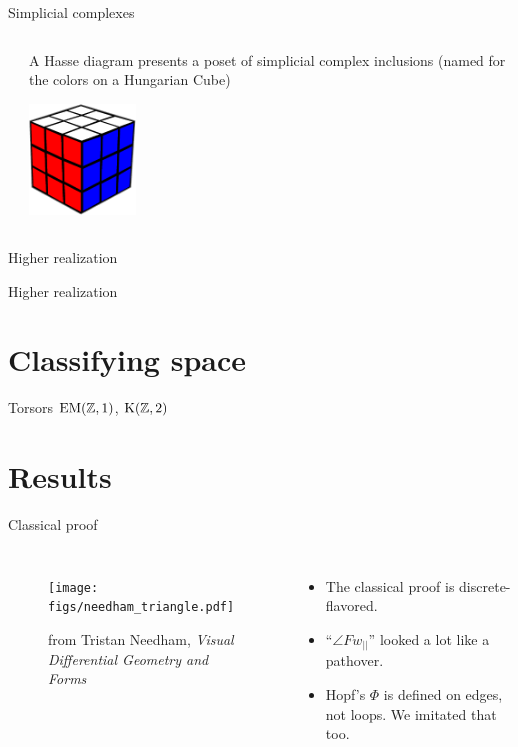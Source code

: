 \documentclass[14pt,aspectratio=169,compress]{beamer}
\begin{document}
\begin{frame}{Simplicial complexes}
\begin{columns}
\begin{column}{0.5\textwidth}
\resizebox{210pt}{!}{%
\begin{tikzpicture}[scale=0.1]

\end{tikzpicture}}
\end{column}
\begin{column}{0.5\textwidth}
A \alert{Hasse diagram} presents a poset of simplicial complex inclusions (named for the colors on a Hungarian Cube)

\includegraphics[width=80pt]{figs/hungarian_cube.pdf}
\end{column}
\end{columns}
\end{frame}

\begin{frame}{Higher realization}

\end{frame}

\begin{frame}{Higher realization}

\end{frame}

\section{Classifying space}

\begin{frame}{Torsors}
\( \mathrm{EM}(\mathbb{Z},1) \), \( \mathrm{K}(\mathbb{Z},2) \)
\end{frame}

\section{Results}
\begin{frame}{Classical proof}
\begin{columns}
\begin{figure}
\texttt{[image: figs/needham\_triangle.pdf]}
\caption{from Tristan Needham, \emph{Visual Differential Geometry and Forms}}
\end{figure}
\begin{itemize}
\item The classical proof is discrete-flavored.
\item ``\( \angle Fw_{||} \)'' looked a lot like a pathover.
\item Hopf's \( \Phi \) is defined on edges, not loops. We imitated that too.
\end{itemize}
\end{columns}
\end{frame}
\end{document}

